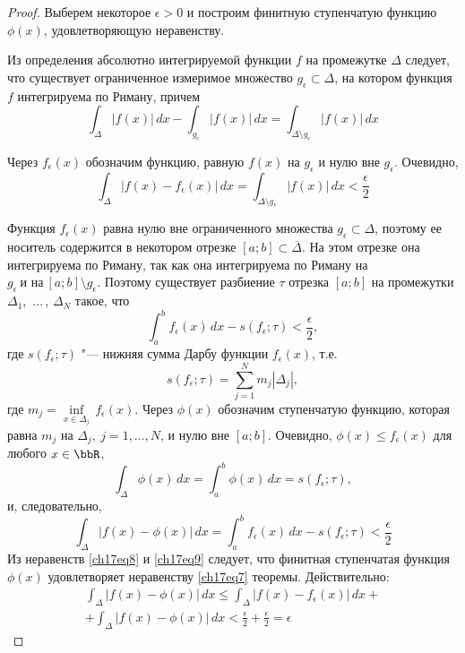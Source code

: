 \begin{proof}
Выберем некоторое $\epsilon > 0$ и построим финитную ступенчатую функцию $\phi(x)$, удовлетворяющую неравенству.

Из определения абсолютно интегрируемой функции $f$ на промежутке $\Delta$ следует, что существует ограниченное измеримое множество $g_{\epsilon} \subset \Delta$, на котором функция $f$ интегрируема по Риману, причем
$$
\int_{\Delta} |f(x)|\,dx - \int_{g_{\epsilon}} |f(x)|\,dx = \int_{\Delta\setminus g_{\epsilon}} |f(x)|\,dx
$$

Через $f_{\epsilon}(x)$ обозначим функцию, равную $f(x)$ на $g_{\epsilon}$ и нулю вне $g_{\epsilon}$. Очевидно,
\begin{equation} \label{ch17eq8}
\int_{\Delta} |f(x) - f_{\epsilon}(x)|\,dx = \int_{\Delta\setminus g_{\epsilon}} |f(x)|\,dx < \frac{\epsilon}{2}
\end{equation}

Функция $f_{\epsilon}(x)$ равна нулю вне ограниченного множества $g_{\epsilon} \subset \Delta$, поэтому ее носитель содержится в некотором отрезке $[a;b] \subset \overline{\Delta}$. На этом отрезке она интегрируема по Риману, так как она интегрируема по Риману на $g_{\epsilon}\ \text{и на}\ [a;b]\setminus g_{\epsilon}$. Поэтому существует разбиение $\tau$ отрезка $[a;b]$ на промежутки $\Delta_1$,~$\ldots\,$, $\Delta_N$ такое, что
$$
\int_{a}^{b} f_{\epsilon}(x)\,dx - s(f_{\epsilon};\tau) < \frac{\epsilon}{2},
$$
где $s(f_{\epsilon};\tau)$ "--- нижняя сумма Дарбу функции $f_{\epsilon}(x)$, т.е.
$$
s(f_{\epsilon};\tau) = \sum_{j = 1}^{N} m_{j}|\Delta_j|,
$$
где $m_j = \inf\limits_{x \in \Delta_j}\,f_{\epsilon}(x)$. Через $\phi(x)$ обозначим ступенчатую функцию, которая равна $m_j$ на $\Delta_j,\ j = 1,\ldots,N$, и нулю вне $[a;b]$. Очевидно, $\phi(x) \le f_{\epsilon}(x)$ для любого $x \in \bbR$,
$$
\int_{\Delta} \phi(x)\,dx = \int_{a}^{b} \phi(x)\,dx = s(f_{\epsilon};\tau),
$$
и, следовательно,
\begin{equation} \label{ch17eq9}
\int_{\Delta} |f(x) - \phi(x)|\,dx = \int_{a}^{b} f_{\epsilon}(x)\,dx - s(f_{\epsilon};\tau) < \frac{\epsilon}{2}
\end{equation}
Из неравенств \eqref{ch17eq8} и \eqref{ch17eq9} следует, что финитная ступенчатая функция $\phi(x)$ удовлетворяет неравенству \eqref{ch17eq7} теоремы. Действительно:
\begin{multline*}
\int_{\Delta} |f(x) - \phi(x)|\,dx \le \int_{\Delta} |f(x) - f_{\epsilon}(x)|\,dx+\\
+\int_{\Delta} |f(x) - \phi(x)|\,dx < \frac{\epsilon}{2} + \frac{\epsilon}{2} = \epsilon \tag*{\qedhere}
\end{multline*}
\end{proof}

